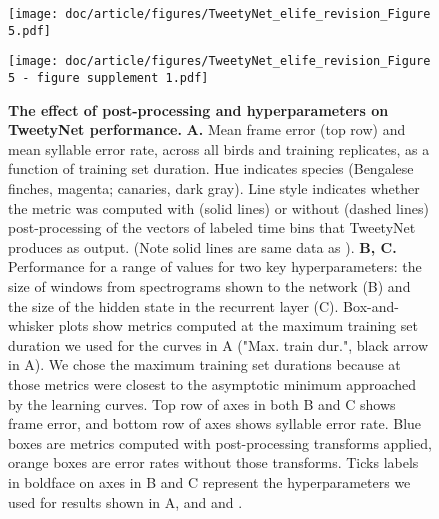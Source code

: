 \documentclass[9pt,lineno]{elife}
\begin{document}
\begin{figure} %
\texttt{[image: doc/article/figures/TweetyNet\_elife\_revision\_Figure 5.pdf]}
\caption{{\bf The effect of post-processing and hyperparameters on TweetyNet performance.}
\textbf{A.} Mean frame error (top row) and mean syllable error rate,  
across all birds and training replicates, as a function of training set duration. 
Hue indicates species (Bengalese finches, magenta; canaries, dark gray). 
Line style indicates whether the metric was computed with (solid lines) 
or without (dashed lines) post-processing of the vectors of labeled time bins that TweetyNet produces as output. 
(Note solid lines are same data as ). 
\textbf{B, C.} Performance for a range of values for two key hyperparameters: 
the size of windows from spectrograms shown to the network (B) 
and the size of the hidden state in the recurrent layer (C). 
Box-and-whisker plots show metrics computed at the maximum training set duration 
we used for the curves in A ("Max. train dur.", black arrow in A). 
We chose the maximum training set durations because at those metrics were closest to 
the asymptotic minimum approached by the learning curves. 
Top row of axes in both B and C shows frame error, 
and bottom row of axes shows syllable error rate. 
Blue boxes are metrics computed with post-processing transforms applied, 
orange boxes are error rates without those transforms.
Ticks labels in boldface on axes in B and C 
represent the hyperparameters we used for results shown 
in A, and  and .
}
\label{fig:post-processing-hyperparams}

{\texttt{[image: doc/article/figures/TweetyNet\_elife\_revision\_Figure 5 - figure supplement 1.pdf]}}\label{figsupp:sf1}


\end{figure}
\end{document}
